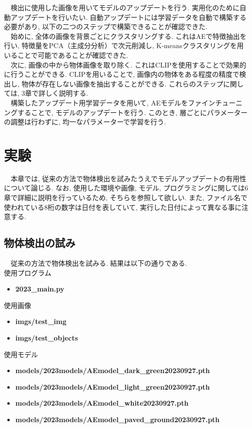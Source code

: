 \documentclass[a4paper, 12pt]{report}
\begin{document}
　検出に使用した画像を用いてモデルのアップデートを行う. 実用化のために自動アップデートを行いたい. 自動アップデートには学習データを自動で構築する必要があり, 以下の二つのステップで構築できることが確認できた. 
\\　始めに, 全体の画像を背景ごとにクラスタリングする. これはAEで特徴抽出を行い, 特徴量をPCA（主成分分析）で次元削減し, K-meansクラスタリングを用いることで可能であることが確認できた. 
\\　次に, 画像の中から物体画像を取り除く. これはCLIPを使用することで効果的に行うことができる. CLIPを用いることで, 画像内の物体をある程度の精度で検出し, 物体が存在しない画像を抽出することができる. 
これらのステップに関しては, 3章で詳しく説明する. 
\\　構築したアップデート用学習データを用いて, AEモデルをファインチューニングすることで, モデルのアップデートを行う. このとき, 層ごとにパラメーターの調整は行わずに, 均一なパラメーターで学習を行う. 

\newpage

\section{実験}
　本章では, 従来の方法で物体検出を試みたうえでモデルアップデートの有用性について論じる. 
なお, 使用した環境や画像, モデル, プログラミングに関しては6章で詳細に説明を行っているため, そちらを参照して欲しい. また, ファイル名で使われている8桁の数字は日付を表していて, 実行した日付によって異なる事に注意する. 

\subsection{物体検出の試み}
　従来の方法で物体検出を試みる. 結果は以下の通りである. \\

使用プログラム
\begin{itemize}
    \item \textbf{2023\_main.py}
\end{itemize}

使用画像
\begin{itemize}
    \item \textbf{imgs/test\_img}
    \item \textbf{imgs/test\_objects}
\end{itemize}

使用モデル
\begin{itemize}
    \item \textbf{models/2023models/AEmodel\_dark\_green20230927.pth}
    \item \textbf{models/2023models/AEmodel\_light\_green20230927.pth}
    \item \textbf{models/2023models/AEmodel\_white20230927.pth}
    \item \textbf{models/2023models/AEmodel\_paved\_ground20230927.pth}
\end{itemize}
\end{document}
